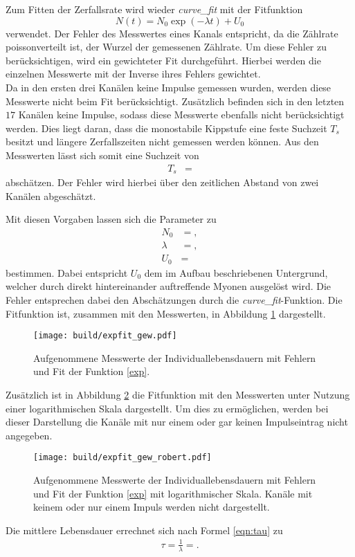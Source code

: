 Zum Fitten der Zerfallsrate wird wieder \emph{curve\_fit} mit der Fitfunktion
\begin{equation}
  N(t) = N_0 \exp{(-\lambda t)} + U_0 \label{exp}
\end{equation}
verwendet.
Der Fehler des Messwertes eines Kanals entspricht, da die Zählrate poissonverteilt ist, der Wurzel der gemessenen Zählrate. %
Um diese Fehler zu berücksichtigen, wird ein gewichteter Fit durchgeführt.
Hierbei werden die einzelnen Messwerte mit der Inverse ihres Fehlers gewichtet.\\
Da in den ersten drei Kanälen keine Impulse gemessen wurden, werden diese Messwerte nicht beim Fit berücksichtigt.
Zusätzlich befinden sich in den letzten $\num{17}$ Kanälen keine Impulse, sodass diese Messwerte ebenfalls nicht berücksichtigt werden.
Dies liegt daran, dass die monostabile Kippstufe eine feste Suchzeit $T_s$ besitzt und längere Zerfallszeiten nicht gemessen werden können.
Aus den Messwerten lässt sich somit eine Suchzeit von
\begin{align*}
  T_s &= 
\end{align*}
abschätzen.
Der Fehler wird hierbei über den zeitlichen Abstand von zwei Kanälen abgeschätzt.

Mit diesen Vorgaben lassen sich die Parameter zu
\begin{align}
  \label{params}
  N_0 &= ,\\
  \lambda &= ,\\
  U_0 &= 
\end{align}
bestimmen.
Dabei entspricht $U_0$ dem im Aufbau beschriebenen Untergrund, welcher durch direkt hintereinander auftreffende Myonen ausgelöst wird.
Die Fehler entsprechen dabei den Abschätzungen durch die \emph{curve\_fit}-Funktion.
Die Fitfunktion ist, zusammen mit den Messwerten, in Abbildung \ref{plot:punkte_err_fit} dargestellt.
\begin{figure}
  \centering
  \texttt{[image: build/expfit\_gew.pdf]}
  \caption{Aufgenommene Messwerte der Individuallebensdauern mit Fehlern und Fit der Funktion \eqref{exp}.}
  \label{plot:punkte_err_fit}
\end{figure}
Zusätzlich ist in Abbildung \ref{plot:punkte_err_fit_robert} die Fitfunktion mit den Messwerten unter Nutzung einer logarithmischen Skala dargestellt.
Um dies zu ermöglichen, werden bei dieser Darstellung die Kanäle mit nur einem oder gar keinen Impulseintrag nicht angegeben.
\begin{figure}
  \centering
  \texttt{[image: build/expfit\_gew\_robert.pdf]}
  \caption{Aufgenommene Messwerte der Individuallebensdauern mit Fehlern und Fit der Funktion \eqref{exp} mit logarithmischer Skala. Kanäle mit keinem oder nur einem Impuls werden nicht dargestellt.}
  \label{plot:punkte_err_fit_robert}
\end{figure}
Die mittlere Lebensdauer errechnet sich nach Formel \eqref{eqn:tau} zu
\begin{align}
  \label{eqn:result}
  \tau = \frac{1}{\lambda} = .
\end{align}

